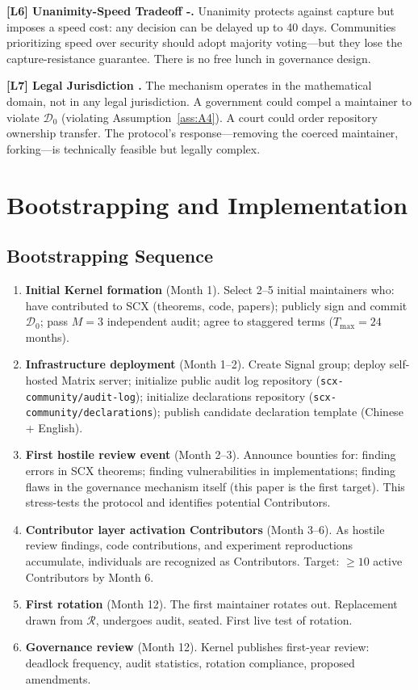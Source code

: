 \documentclass[12pt,a4paper]{article}
\theoremstyle{definition}
\newcommand{\RotationPool}{\mathcal{R}}
\newcommand{\limitationTag}[1]{\textsf{\textbf{[L#1]}}}
\newcommand{\GzeroDecl}{\mathcal{D}_{0}}
\begin{document}
\begin{enumerate}[label=\limitationTag{\arabic*},leftmargin=*]
    \item \textbf{\limitationTag{6} Unanimity-Speed Tradeoff -.} Unanimity protects against capture but imposes a speed cost: any decision can be delayed up to 40 days. Communities prioritizing speed over security should adopt majority voting---but they lose the capture-resistance guarantee. There is no free lunch in governance design.
    \item \textbf{\limitationTag{7} Legal Jurisdiction .} The mechanism operates in the mathematical domain, not in any legal jurisdiction. A government could compel a maintainer to violate $\GzeroDecl$ (violating Assumption~\ref{ass:A4}). A court could order repository ownership transfer. The protocol's response---removing the coerced maintainer, forking---is technically feasible but legally complex.
\end{enumerate}
\section{Bootstrapping and Implementation}
\label{sec:bootstrapping}
\subsection{Bootstrapping Sequence}
\begin{enumerate}[label=\textbf{Step \arabic*},leftmargin=*]
    \item \textbf{Initial Kernel formation} (Month 1). Select 2--5 initial maintainers who: have contributed to SCX (theorems, code, papers); publicly sign and commit $\GzeroDecl$; pass $M=3$ independent audit; agree to staggered terms ($T_{\max} = 24$ months).
    \item \textbf{Infrastructure deployment} (Month 1--2). Create Signal group; deploy self-hosted Matrix server; initialize public audit log repository (\texttt{scx-community/audit-log}); initialize declarations repository (\texttt{scx-community/declarations}); publish candidate declaration template (Chinese + English).
    \item \textbf{First hostile review event} (Month 2--3). Announce bounties for: finding errors in SCX theorems; finding vulnerabilities in implementations; finding flaws in the governance mechanism itself (this paper is the first target). This stress-tests the protocol and identifies potential Contributors.
    \item \textbf{Contributor layer activation Contributors} (Month 3--6). As hostile review findings, code contributions, and experiment reproductions accumulate, individuals are recognized as Contributors. Target: $\geq 10$ active Contributors by Month 6.
    \item \textbf{First rotation} (Month 12). The first maintainer rotates out. Replacement drawn from $\RotationPool$, undergoes audit, seated. First live test of rotation.
    \item \textbf{Governance review} (Month 12). Kernel publishes first-year review: deadlock frequency, audit statistics, rotation compliance, proposed amendments.
\end{enumerate}
\end{document}
